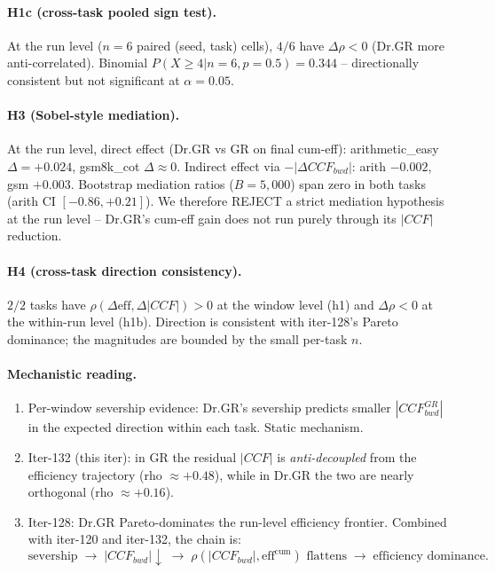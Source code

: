 \documentclass{article}
\begin{document}
\paragraph{H1c (cross-task pooled sign test).}
At the run level ($n=6$ paired (seed, task) cells), $4/6$ have
$\Delta\rho<0$ (Dr.GR more anti-correlated).  Binomial
$P(X\ge 4 | n=6, p=0.5)=0.344$ -- directionally consistent but
not significant at $\alpha=0.05$.

\paragraph{H3 (Sobel-style mediation).}
At the run level, direct effect (Dr.GR vs GR on final cum-eff):
arithmetic\_easy $\Delta=+0.024$, gsm8k\_cot $\Delta\approx 0$.
Indirect effect via $-|\Delta CCF_{bwd}|$: arith $-0.002$, gsm $+0.003$.
Bootstrap mediation ratios ($B=5{,}000$) span zero in both tasks
(arith CI $[-0.86, +0.21]$).  We therefore REJECT a strict
mediation hypothesis at the run level -- Dr.GR's cum-eff gain
does not run purely through its $|\!CCF\!|$ reduction.

\paragraph{H4 (cross-task direction consistency).}
$2/2$ tasks have $\rho(\Delta\mathrm{eff}, \Delta|CCF|) > 0$ at the
window level (h1) and $\Delta\rho < 0$ at the within-run level
(h1b).  Direction is consistent with iter-128's Pareto dominance;
the magnitudes are bounded by the small per-task $n$.

\paragraph{Mechanistic reading.}
\begin{enumerate}
\item Per-window severship evidence: Dr.GR's severship predicts smaller
$|CCF^{GR}_{bwd}|$ in the expected direction within each task.  Static mechanism.
\item Iter-132 (this iter): in GR the residual $|CCF|$ is
\emph{anti-decoupled} from the efficiency trajectory (rho $\approx +0.48$),
while in Dr.GR the two are nearly orthogonal (rho $\approx +0.16$).
\item Iter-128: Dr.GR Pareto-dominates the run-level efficiency
frontier.  Combined with iter-120 and iter-132, the chain is:
\[
\text{severship} \;\longrightarrow\; |CCF_{bwd}|\downarrow
\;\longrightarrow\; \rho(|CCF_{bwd}|, \mathrm{eff}^{\mathrm{cum}})
\text{ flattens} \;\longrightarrow\; \text{efficiency dominance}.
\]
\end{enumerate}
\end{document}
